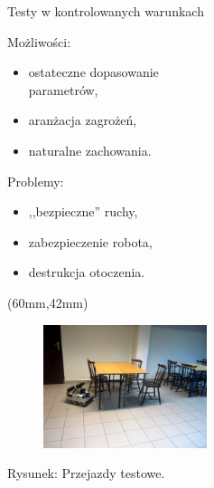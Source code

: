 \documentclass[xcolor=x11names,compress]{beamer}
\renewcommand{\(}{\begin{columns}}
\renewcommand{\)}{\end{columns}}
\newcommand{\<}[1]{\begin{column}{#1}}
\renewcommand{\>}{\end{column}}
\begin{document}
\begin{frame}{Testy w kontrolowanych warunkach}

\alert{Możliwości:}
\begin{itemize}
\item ostateczne dopasowanie \\parametrów,
\item aranżacja zagrożeń,
\item naturalne zachowania.
\end{itemize}

\vspace{.7cm}

\alert{Problemy:}
\begin{itemize}
\item ,,bezpieczne'' ruchy,
\item zabezpieczenie robota,
\item destrukcja otoczenia.
\end{itemize}

\begin{textblock*}{70mm}(60mm,42mm)%
    \begin{minipage}[c]{70mm}%
	\begin{figure}[h!]
	\includegraphics[width=4.8cm]{../Common/img/test_1}
	\end{figure}
	\hspace{1cm}\scriptsize \alert{Rysunek:} Przejazdy testowe.
    \end{minipage}
\end{textblock*}

\end{frame}
\end{document}
